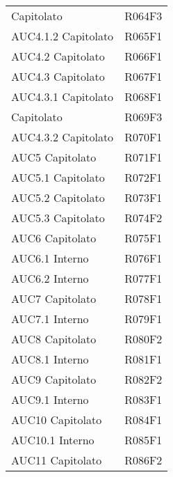 \documentclass[../analisi-dei-requisiti.tex]{subfiles}
\begin{document}
\begin{longtable}[H]{ p{4cm} | p{4cm} }
  Capitolato                    & R064F3                               \\
  AUC4.1.2 Capitolato           & R065F1                               \\
  AUC4.2 Capitolato             & R066F1                               \\
  AUC4.3 Capitolato             & R067F1                               \\
  AUC4.3.1 Capitolato           & R068F1                               \\
  Capitolato                    & R069F3                               \\
  AUC4.3.2 Capitolato           & R070F1                               \\
  AUC5 Capitolato               & R071F1                               \\
  AUC5.1 Capitolato             & R072F1                               \\
  AUC5.2 Capitolato             & R073F1                               \\
  AUC5.3 Capitolato             & R074F2                               \\
  AUC6 Capitolato               & R075F1                               \\
  AUC6.1 Interno                & R076F1                               \\
  AUC6.2 Interno                & R077F1                               \\
  AUC7 Capitolato               & R078F1                               \\
  AUC7.1 Interno                & R079F1                               \\
  AUC8 Capitolato               & R080F2                               \\
  AUC8.1 Interno                & R081F1                               \\
  AUC9 Capitolato               & R082F2                               \\
  AUC9.1 Interno                & R083F1                               \\
  AUC10 Capitolato              & R084F1                               \\
  AUC10.1 Interno               & R085F1                               \\
  AUC11 Capitolato              & R086F2                               \\

\end{longtable}
\end{document}
